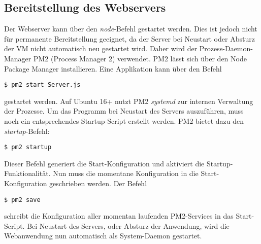 \subsection{Bereitstellung des Webservers}
Der Webserver kann über den \textit{node}-Befehl gestartet werden. Dies ist jedoch nicht für permanente Bereitstellung geeignet, da der Server bei Neustart oder Absturz der \acs{VM} nicht automatisch neu gestartet wird. Daher wird der Prozess-Daemon-Manager \glqq{}PM2\grqq{} (Process Manager 2) verwendet. PM2 lässt sich über den Node Package Manager installieren. Eine Applikation kann über den Befehl
\lstset{style=STYLE_COMMAND_LINE_ARGUMENT_SINGLE_LINE}
\begin{lstlisting}[belowskip=-0.8 \baselineskip]
$ pm2 start Server.js
\end{lstlisting}
gestartet werden. Auf Ubuntu 16+ nutzt PM2 \textit{systemd} zur internen Verwaltung der Prozesse. Um das Programm bei Neustart des Servers auszuführen, muss noch ein entsprechendes \glqq{}Startup-Script\grqq{} erstellt werden. PM2 bietet dazu den \textit{startup}-Befehl:
\lstset{style=STYLE_COMMAND_LINE_ARGUMENT_SINGLE_LINE}
\begin{lstlisting}[belowskip=-0.8 \baselineskip]
$ pm2 startup
\end{lstlisting}
Dieser Befehl generiert die Start-Konfiguration und aktiviert die Startup-Funktionalität. Nun muss die momentane Konfiguration in die Start-Konfiguration geschrieben werden. Der Befehl 
\lstset{style=STYLE_COMMAND_LINE_ARGUMENT_SINGLE_LINE}
\begin{lstlisting}[belowskip=-0.8 \baselineskip]
$ pm2 save
\end{lstlisting}
schreibt die Konfiguration aller momentan laufenden PM2-Services in das Start-Script. Bei Neustart des Servers, oder Absturz der Anwendung, wird die Webanwendung nun automatisch als System-Daemon gestartet.